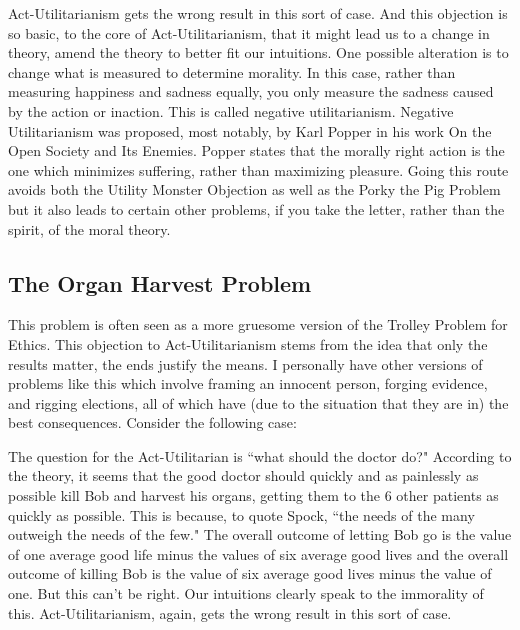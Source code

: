 Act-Utilitarianism gets the wrong result in this sort of case. And this objection is so basic, to the core of Act-Utilitarianism, that it might lead us to a change in theory, amend the theory to better fit our intuitions. One possible alteration is to change what is measured to determine morality. In this case, rather than measuring happiness and sadness equally, you only measure the sadness caused by the action or inaction. This is called negative utilitarianism. Negative Utilitarianism was proposed, most notably, by Karl Popper in his work On the Open Society and Its Enemies. Popper states that the morally right action is the one which minimizes suffering, rather than maximizing pleasure. Going this route avoids both the Utility Monster Objection as well as the Porky the Pig Problem but it also leads to certain other problems, if you take the letter, rather than the spirit, of the moral theory. 

\subsection{The Organ Harvest Problem}

This problem is often seen as a more gruesome version of the Trolley Problem for Ethics. This objection to Act-Utilitarianism stems from the idea that only the results matter, the ends justify the means. I personally have other versions of problems like this which involve framing an innocent person, forging evidence, and rigging elections, all of which have (due to the situation that they are in) the best consequences. Consider the following case:


The question for the Act-Utilitarian is ``what should the doctor do?" According to the theory, it seems that the good doctor should quickly and as painlessly as possible kill Bob and harvest his organs, getting them to the 6 other patients as quickly as possible. This is because, to quote Spock, ``the needs of the many outweigh the needs of the few." The overall outcome of letting Bob go is the value of one average good life minus the values of six average good lives and the overall outcome of killing Bob is the value of six average good lives minus the value of one. But this can't be right. Our intuitions clearly speak to the immorality of this.  Act-Utilitarianism, again, gets the wrong result in this sort of case. 

